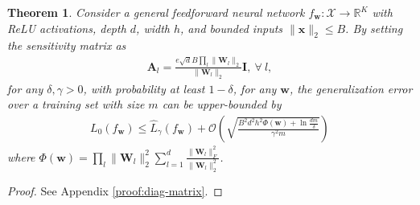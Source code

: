 \documentclass[journal]{IEEEtran} %
\newtheorem{theorem}{Theorem}%
\def\vw{{\bm{w}}}
\def\vx{{\bm{x}}}
\def\mA{{\bm{A}}}
\def\mI{{\bm{I}}}
\def\mW{{\bm{W}}}
\def\gO{{\mathcal{O}}}
\def\gX{{\mathcal{X}}}
\newcommand{\R}{\mathbb{R}}
\newcommand{\Norm}[1]{\|#1\|}
\begin{document}
\begin{theorem}\label{thm:diag-matrix}
Consider a general feedforward neural network $f_{\vw}: \gX \to \R^K$ with ReLU activations, depth $d$, width $h$, and bounded inputs $\Norm{\vx}_2 \le B$.
    By setting the sensitivity matrix as
    \begin{align} \label{eq:diagonal-Al}
        \mA_l =  \frac{ e\sqrt{d}B \prod_l \Norm{\mW_l}_2}{\Norm{\mW_l}_2} \mI, \ \forall~l,
    \end{align}
    for any $\delta,\gamma>0$, with probability at least $1-\delta$, for any $\vw$, the generalization error over a training set with size $m$ can be upper-bounded by
    \begin{align}
    L_0(f_{\vw}) \le \hat{L}_{\gamma}(f_{\vw}) + \gO \left( \sqrt{ \frac{ B^2 d^2h^2\Phi(\vw) + \ln \frac{dm}{\delta}}{\gamma^2m}} \right)
    \end{align}
    where $\Phi(\vw)=\prod_l \Norm{\mW_l}_2^2  \sum_{l=1}^d \frac{\Norm{\mW_l}_F^2}{\Norm{\mW_l}_2^2}$.
\end{theorem}

\begin{proof}
See Appendix \ref{proof:diag-matrix}.
\end{proof}
\end{document}
